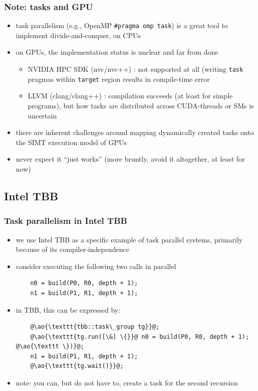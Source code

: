 \documentclass[12pt,dvipdfmx]{beamer}
\newcommand{\ao}[1]{{\color{blue}#1}}
\newcommand{\aka}[1]{{\color{red}#1}}
\begin{document}
\begin{frame}
\frametitle{Note: tasks and GPU}
\begin{itemize}
\item task parallelism (e.g., OpenMP {\tt \#pragma omp task}) is a great tool to implement divide-and-conquer, \ao{on CPUs}
\item \aka{on GPUs}, the implementation status is unclear and far from done
  \begin{itemize}
  \item NVIDIA HPC SDK (nvc/nvc++) : not supported at all (writing {\tt task} pragmas within {\tt target} region results in compile-time error
  \item LLVM (clang/clang++) : compilation succeeds (at least for simple programs), but how tasks are distributed across CUDA-threads or SMs is uncertain
  \end{itemize}
\item there are inherent challenges around mapping dynamically created tasks onto the SIMT execution model of GPUs
\item never expect it ``just works'' (more bruntly, avoid it altogether, at least for now)
\end{itemize}
\end{frame}


\iffalse
\subsection{Intel TBB}
\begin{frame}[fragile]
\frametitle{Task parallelism in Intel TBB}
\begin{itemize}
\item we use Intel TBB as a specific example of task parallel
  systems, primarily because of its compiler-independence
\item consider executing the following two calls in parallel
\begin{lstlisting}
    n0 = build(P0, R0, depth + 1);
    n1 = build(P1, R1, depth + 1);
\end{lstlisting}
\item in TBB, this can be expressed by:
\begin{lstlisting}
    @\ao{\texttt{tbb::task\_group tg}}@;
    @\ao{\texttt{tg.run([\&] \{}}@ n0 = build(P0, R0, depth + 1); @\ao{\texttt \})}@;
    n1 = build(P1, R1, depth + 1);
    @\ao{\texttt{tg.wait()}}@;
\end{lstlisting}

\item note: you can, but do not have to, create a task for the second recursion
\end{itemize}
\end{frame}
\end{document}
